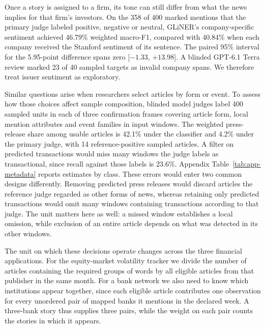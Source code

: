 Once a story is assigned to a firm, its tone can still differ from
what the news implies for that firm's investors. On the 358 of 400
marked mentions that the primary judge labeled positive, negative or
neutral, GLiNER's company-specific sentiment achieved 46.79\% weighted
macro-F1, compared with 40.84\% when each company received the
Stanford sentiment of its sentence. The paired 95\% interval for the
5.95-point difference spans zero [$-1.33$, $+13.98$]. A blinded
GPT-6.1 Terra review marked 23 of 40 sampled targets as invalid
company spans. We therefore treat issuer sentiment as exploratory.

Similar questions arise when researchers select articles by form or
event. To assess how those choices affect sample composition, blinded
model judges label 400 sampled units in each of three confirmation
frames covering article form, local mention attributes and event
families in input windows. The weighted
press-release share among usable articles is 42.1\% under the
classifier and 4.2\% under the primary judge, with 14 reference-positive
sampled articles. A filter on predicted transactions would miss many
windows the judge labels as transactional, since recall against those
labels is 23.6\%. Appendix
Table~\ref{tab:app-metadata} reports estimates by class. These errors
would enter two common designs differently. Removing predicted press
releases would discard articles the reference judge regarded as other
forms of news, whereas retaining only predicted transactions would omit
many windows containing transactions according to that judge. The unit
matters here as well: a missed window establishes a local omission,
while exclusion of an entire article depends on what was detected in
its other windows.

The unit on which these decisions operate changes across the three
financial applications. For the equity-market volatility tracker we
divide the number of articles containing the required groups of words
by all eligible articles from that publisher in the same month. For a
bank network we also need to know which institutions appear together,
since each eligible article contributes one observation for every
unordered pair of mapped banks it mentions in the declared week. A
three-bank story thus supplies three pairs, while the weight on each
pair counts the stories in which it appears.

